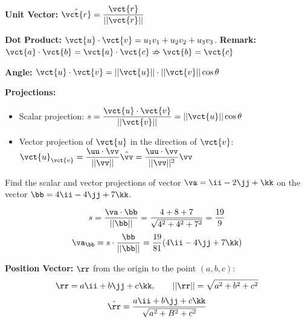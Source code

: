 \begin{spacing}{1.3}
    {\bf Unit Vector:} $\hat{\vct{r}}=\dfrac{\vct{r}}{||\vct{r}||}$

    {\bf Dot Product:} $\vct{u}\cdot \vct{v}=u_1v_1+u_2v_2+u_3v_3$.
    {\bf Remark: } $\vct{a}\cdot \vct{b}=\vct{a}\cdot \vct{c} \nRightarrow \vct{b}=\vct{c}$

    {\bf Angle:} $\vct{u}\cdot \vct{v}=||\vct{u}||\cdot ||\vct{v}||\cos\theta$

    {\bf Projections:}
    \begin{itemize}
        \item Scalar projection: $s=\dfrac{\vct{u}\cdot \vct{v}}{||\vct{v}||}=
        ||\vct{u}||\cos \theta$
        \item Vector projection of $\vct{u}$ in the direction of $\vct{v}$: 
        $\vct{u}_{\vct{v}}=\dfrac{\uu\cdot \vv}{||\vv||}\hat{\vv}=
        \dfrac{\uu\cdot \vv}{||\vv||^2}\vv$
    \end{itemize}

    \eg Find the scalar and vector projections of vector $\va=\ii-2\jj+\kk$ on
    the vector $\bb=4\ii-4\jj+7\kk$.

    \sol $$s=\frac{\va\cdot \bb}{||\bb||}=\frac{4+8+7}{\sqrt{4^2+4^2+7^2}}=\frac{19}{9}$$
    $$\va_{\bb}=s\cdot \frac{\bb}{||\bb||}=\frac{19}{81}(4\ii-4\jj+7\kk)$$

    {\bf Position Vector:} $\rr$ from the origin to the point $(a,b,c)$: 
    $$\rr = a\ii+b\jj+c\kk,\qquad ||\rr||=\sqrt{a^2+b^2+c^2}$$
    $$\hat{\rr}=\frac{a\ii+b\jj+c\kk}{\sqrt{a^2+B^2+c^2}}$$


\end{spacing}
